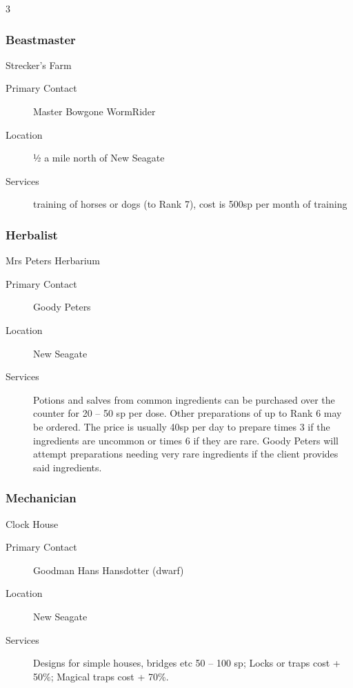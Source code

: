 \begin{multicols}{3}
\subsubsection{Beastmaster}

Strecker’s Farm
\
\begin{description}
\item[Primary Contact] Master Bowgone WormRider
\item[Location] ½ a mile north of New Seagate
\item[Services] training of horses or dogs (to Rank 7), cost is 500sp
  per month of training
\end{description}

\subsubsection{Herbalist}

Mrs Peters Herbarium

\begin{description}

\item[Primary Contact] Goody Peters

\item[Location] New Seagate

\item[Services] Potions and salves from common ingredients can be
  purchased over the counter for 20 – 50 sp per dose. Other
  preparations of up to Rank 6 may be ordered.  The price is usually
  40sp per day to prepare times 3 if the ingredients are uncommon or
  times 6 if they are rare. Goody Peters will attempt preparations
  needing very rare ingredients if the client provides said
  ingredients.
\end{description}

\subsubsection{Mechanician}

Clock House

\begin{description}
\item[Primary Contact] Goodman Hans Hansdotter
(dwarf)
\item[Location] New Seagate
\item[Services] Designs for simple houses, bridges
etc 50 – 100 sp; Locks or traps cost + 50\%;
Magical traps cost + 70\%.
\end{description}


\end{multicols}
